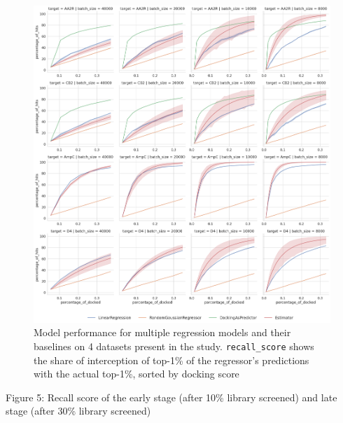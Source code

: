 \begin{figure}[ht]
\centering
\includegraphics[width=1.0\textwidth]{figures/figure_4_iterations.png}
\caption{Model performance for multiple regression models and their baselines on 4 datasets present in the study. \texttt{recall\_score} shows the share of interception of top-1\% of the regressor's predictions with the actual top-1\%, sorted by docking score}
\label{fig:fig_4_extrapolation}
\end{figure}

\begin{table}[!ht]
    \centering
    \begin{adjustbox}{angle=90}
        \resizebox{1.2\textwidth}{!}
        {
            
        }
    \end{adjustbox}
    \caption{Figure 5: Recall score of the early stage (after 10\% library screened) and late stage (after 30\% library screened)}
    \label{tab:tab_1_activelearning}
\end{table}


